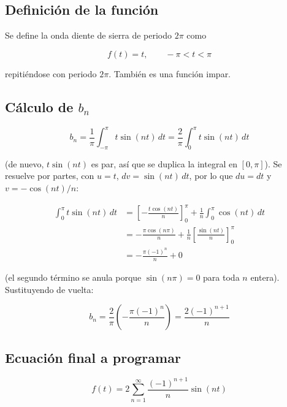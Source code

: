 \documentclass[11pt]{article}
\begin{document}
\subsection{Definición de la función}

Se define la onda diente de sierra de periodo $2\pi$ como

\begin{equation}
f(t) = t, \qquad -\pi < t < \pi
\end{equation}

repitiéndose con periodo $2\pi$. También es una función impar.

\subsection{Cálculo de $b_n$}

\begin{equation}
b_n = \frac{1}{\pi} \int_{-\pi}^{\pi} t \sin(nt)\, dt
    = \frac{2}{\pi} \int_{0}^{\pi} t \sin(nt)\, dt
\end{equation}

(de nuevo, $t\sin(nt)$ es par, así que se duplica la integral en
$[0,\pi]$). Se resuelve por partes, con $u = t$, $dv = \sin(nt)\,dt$,
por lo que $du = dt$ y $v = -\cos(nt)/n$:

\begin{align}
\int_0^{\pi} t \sin(nt)\, dt
&= \left[ -\frac{t\cos(nt)}{n} \right]_0^{\pi} + \frac{1}{n}\int_0^{\pi} \cos(nt)\, dt \\
&= -\frac{\pi \cos(n\pi)}{n} + \frac{1}{n}\left[\frac{\sin(nt)}{n}\right]_0^{\pi} \\
&= -\frac{\pi (-1)^n}{n} + 0
\end{align}

(el segundo término se anula porque $\sin(n\pi) = 0$ para toda $n$
entera). Sustituyendo de vuelta:

\begin{equation}
b_n = \frac{2}{\pi}\left(-\frac{\pi(-1)^n}{n}\right) = \frac{2(-1)^{n+1}}{n}
\end{equation}

\subsection{Ecuación final a programar}

\begin{equation}
\boxed{\;f(t) = 2 \sum_{n=1}^{\infty} \frac{(-1)^{n+1}}{n} \sin(nt)\;}
\end{equation}
\end{document}
